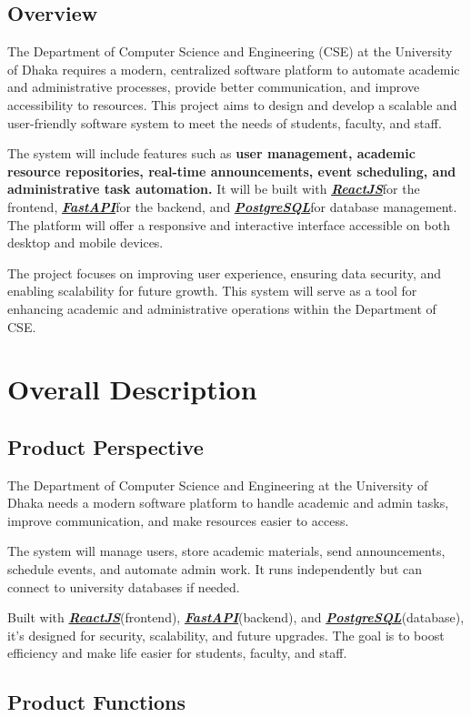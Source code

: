 \documentclass[11pt]{article}
\newcommand{\ReactJS}{\href{https://react.dev/}{\textbf{\textcolor{reactColor}{\textit{ReactJS}}}}}
\newcommand{\FastAPI}{\href{https://fastapi.tiangolo.com/}{\textbf{{\textcolor{fastAPIColor}{\textit{FastAPI}}}}}}
\newcommand{\PostgreSQL}{\href{https://www.postgresql.org/}{\textbf{{\textcolor{postgresColor}{\textit{PostgreSQL}}}}}}
\begin{document}
\subsection{Overview}
The Department of Computer Science and Engineering (CSE) at the University of Dhaka requires a modern, centralized software platform to automate academic and administrative processes, provide better communication, and improve accessibility to resources. This project aims to design and develop a scalable and user-friendly software system to meet the needs of students, faculty, and staff.

The system will include features such as \textbf{user management, academic resource repositories, real-time announcements, event scheduling, and administrative task automation.} It will be built with \ReactJS \space for the frontend, \FastAPI \space for the backend, and \PostgreSQL \space for database management. The platform will offer a responsive and interactive interface accessible on both desktop and mobile devices.

The project focuses on improving user experience, ensuring data security, and enabling scalability for future growth. This system will serve as a tool for enhancing academic and administrative operations within the Department of CSE.



\section{Overall Description}
\subsection{Product Perspective}
The Department of Computer Science and Engineering at the University of Dhaka needs a modern software platform to handle academic and admin tasks, improve communication, and make resources easier to access.

The system will manage users, store academic materials, send announcements, schedule events, and automate admin work. It runs independently but can connect to university databases if needed.  

Built with \ReactJS\space (frontend), \FastAPI\space (backend), and \PostgreSQL\space (database), it’s designed for security, scalability, and future upgrades. The goal is to boost efficiency and make life easier for students, faculty, and staff.

\subsection{Product Functions}
\end{document}
